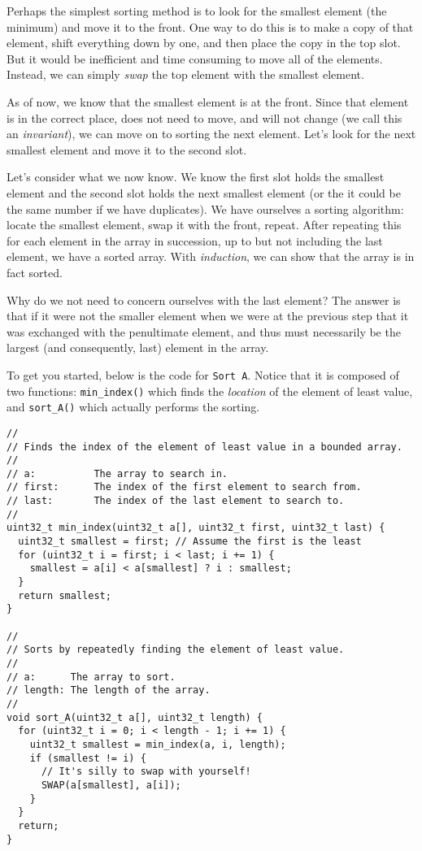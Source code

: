 \documentclass{article}
\begin{document}
\noindent Perhaps the simplest sorting method is to look for the smallest element
(the minimum) and move it to the front. One way to do this is to
make a copy of that element, shift everything down by one, and then
place the copy in the top slot. But it would be inefficient and
time consuming to move all of the elements. Instead, we can simply
\emph{swap} the top element with the smallest element.

As of now, we know that the smallest element is at the front. Since
that element is in the correct place, does not need to move, and
will not change (we call this an \emph{invariant}), we can move on
to sorting the next element. Let's look for the next smallest element and move it to
the second slot.

Let's consider what we now know. We know the first slot holds the
smallest element and the second slot holds the next smallest element
(or the it could be the same number if we have duplicates). We have
ourselves a sorting algorithm: locate the smallest element, swap
it with the front, repeat. After repeating this for each element
in the array in succession, up to but not including the last element,
we have a sorted array. With \emph{induction}, we can show that the
array is in fact sorted.

Why do we not need to concern ourselves with the last element? The
answer is that if it were not the smaller element when we were at
the previous step that it was exchanged with the penultimate element,
and thus must necessarily be the largest (and consequently, last)
element in the array.

To get you started, below is the code for
\texttt{Sort A}. Notice that it is composed of two functions:
\texttt{min\_index()} which finds the \emph{location} of the element of least
value, and \texttt{sort\_A()} which actually performs the sorting.

\begin{lstlisting}[title=Sort A (in \textbf{C})]
//
// Finds the index of the element of least value in a bounded array.
//
// a:          The array to search in.
// first:      The index of the first element to search from.
// last:       The index of the last element to search to.
//
uint32_t min_index(uint32_t a[], uint32_t first, uint32_t last) {
  uint32_t smallest = first; // Assume the first is the least
  for (uint32_t i = first; i < last; i += 1) {
    smallest = a[i] < a[smallest] ? i : smallest;
  }
  return smallest;
}

//
// Sorts by repeatedly finding the element of least value.
//
// a:      The array to sort.
// length: The length of the array.
//
void sort_A(uint32_t a[], uint32_t length) {
  for (uint32_t i = 0; i < length - 1; i += 1) {
    uint32_t smallest = min_index(a, i, length);
    if (smallest != i) {
      // It's silly to swap with yourself!
      SWAP(a[smallest], a[i]);
    }
  }
  return;
}
\end{lstlisting}
\end{document}
